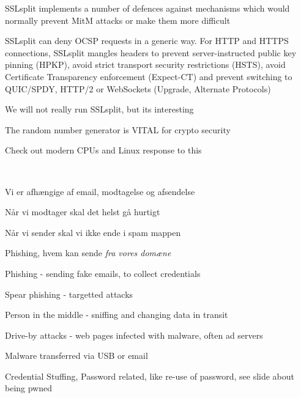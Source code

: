 \documentclass[Screen16to9,17pt]{foils}
\begin{document}

\begin{list2}
\item SSLsplit implements a number of defences against mechanisms which would normally prevent MitM attacks or make them more difficult
\item {\small SSLsplit can deny OCSP requests in a generic way. For HTTP and HTTPS connections, SSLsplit mangles headers to prevent server-instructed public key pinning (HPKP), avoid strict transport security restrictions (HSTS), avoid Certificate Transparency enforcement (Expect-CT) and prevent switching to QUIC/SPDY, HTTP/2 or WebSockets (Upgrade, Alternate Protocols)}
\end{list2}

\centerline{We will not really run SSLsplit, but its interesting}










{\small{}}

\centerline{The random number generator is VITAL for crypto security}

Check out modern CPUs and Linux response to this\\



{~}

\begin{list2}
\item Vi er afhængige af email, modtagelse og afsendelse
\item Når vi modtager skal det helst gå hurtigt
\item Når vi sender skal vi ikke ende i spam mappen
\item Phishing, hvem kan sende \emph{fra vores domæne}
\end{list2}



\begin{list2}
\item Phishing - sending fake emails, to collect credentials
\item Spear phishing - targetted attacks
\item Person in the middle - sniffing and changing data in transit
\item Drive-by attacks - web pages infected with malware, often ad servers
\item Malware transferred via USB or email
\item Credential Stuffing, Password related, like re-use of password, see slide about being pwned
\end{list2}
\end{document}
